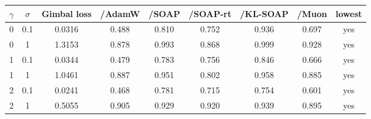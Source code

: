 \begin{tabular}{ccccccccc}
\toprule
$\gamma$ & $\sigma$ & Gimbal loss & /AdamW & /SOAP & /SOAP-rt & /KL-SOAP & /Muon & lowest \\
\midrule
0 & 0.1 & 0.0316 & 0.488 & 0.810 & 0.752 & 0.936 & 0.697 & yes \\
0 & 1 & 1.3153 & 0.878 & 0.993 & 0.868 & 0.999 & 0.928 & yes \\
1 & 0.1 & 0.0344 & 0.479 & 0.783 & 0.756 & 0.846 & 0.666 & yes \\
1 & 1 & 1.0461 & 0.887 & 0.951 & 0.802 & 0.958 & 0.885 & yes \\
2 & 0.1 & 0.0241 & 0.468 & 0.781 & 0.715 & 0.754 & 0.601 & yes \\
2 & 1 & 0.5055 & 0.905 & 0.929 & 0.920 & 0.939 & 0.895 & yes \\
\bottomrule
\end{tabular}
